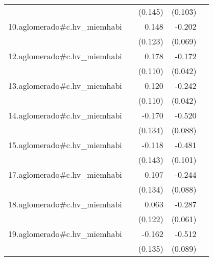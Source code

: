 {\begin{longtable}{l*{4}{D{.}{.}{-1}}}
            &                     &     (0.145)         &     (0.103)         &                     \\
\addlinespace
10.aglomerado#c.hv\_miemhabi&                     &       0.148         &      -0.202\sym{**} &                     \\
            &                     &     (0.123)         &     (0.069)         &                     \\
\addlinespace
12.aglomerado#c.hv\_miemhabi&                     &       0.178         &      -0.172\sym{***}&                     \\
            &                     &     (0.110)         &     (0.042)         &                     \\
\addlinespace
13.aglomerado#c.hv\_miemhabi&                     &       0.120         &      -0.242\sym{***}&                     \\
            &                     &     (0.110)         &     (0.042)         &                     \\
\addlinespace
14.aglomerado#c.hv\_miemhabi&                     &      -0.170         &      -0.520\sym{***}&                     \\
            &                     &     (0.134)         &     (0.088)         &                     \\
\addlinespace
15.aglomerado#c.hv\_miemhabi&                     &      -0.118         &      -0.481\sym{***}&                     \\
            &                     &     (0.143)         &     (0.101)         &                     \\
\addlinespace
17.aglomerado#c.hv\_miemhabi&                     &       0.107         &      -0.244\sym{**} &                     \\
            &                     &     (0.134)         &     (0.088)         &                     \\
\addlinespace
18.aglomerado#c.hv\_miemhabi&                     &       0.063         &      -0.287\sym{***}&                     \\
            &                     &     (0.122)         &     (0.061)         &                     \\
\addlinespace
19.aglomerado#c.hv\_miemhabi&                     &      -0.162         &      -0.512\sym{***}&                     \\
            &                     &     (0.135)         &     (0.089)         &                     \\

\end{longtable}}
